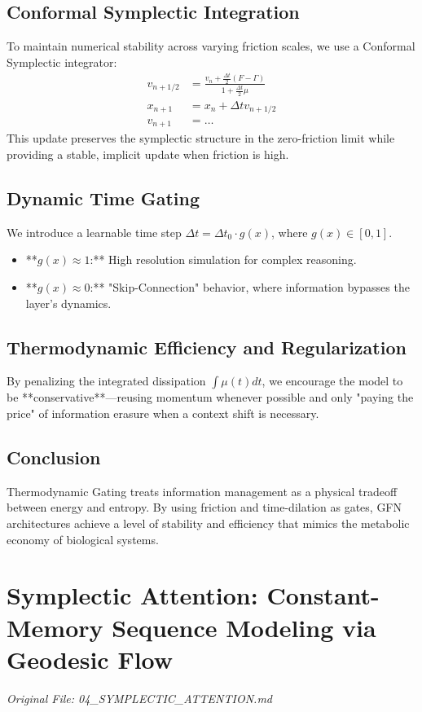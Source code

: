 \documentclass[11pt,a4paper]{report}
\begin{document}
\section{Conformal Symplectic Integration}
To maintain numerical stability across varying friction scales, we use a Conformal Symplectic integrator:
\begin{align}
    v_{n+1/2} &= \frac{v_n + \frac{\Delta t}{2}(F - \Gamma)}{1 + \frac{\Delta t}{2}\mu} \\
    x_{n+1} &= x_n + \Delta t v_{n+1/2} \\
    v_{n+1} &= \dots
\end{align}
This update preserves the symplectic structure in the zero-friction limit while providing a stable, implicit update when friction is high.

\section{Dynamic Time Gating}
We introduce a learnable time step $\Delta t = \Delta t_0 \cdot g(x)$, where $g(x) \in [0, 1]$.
\begin{itemize}
    \item **$g(x) \approx 1$:** High resolution simulation for complex reasoning.
    \item **$g(x) \approx 0$:** "Skip-Connection" behavior, where information bypasses the layer's dynamics.
\end{itemize}

\section{Thermodynamic Efficiency and Regularization}
By penalizing the integrated dissipation $\int \mu(t) dt$, we encourage the model to be **conservative**—reusing momentum whenever possible and only "paying the price" of information erasure when a context shift is necessary.

\section{Conclusion}
Thermodynamic Gating treats information management as a physical tradeoff between energy and entropy. By using friction and time-dilation as gates, GFN architectures achieve a level of stability and efficiency that mimics the metabolic economy of biological systems.

\chapter{Symplectic Attention: Constant-Memory Sequence Modeling via Geodesic Flow}
\textit{Original File: 04\_SYMPLECTIC\_ATTENTION.md}
\end{document}
